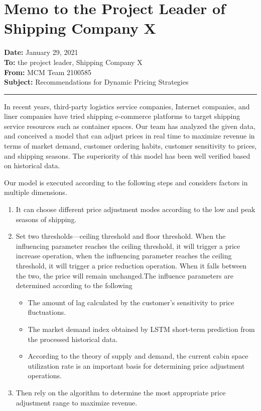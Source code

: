 \section{Memo to the Project Leader of Shipping Company X}
\noindent\textbf{Date:} January 29, 2021\\
\textbf{To:} the project leader, Shipping Company X\\
\textbf{From:} MCM Team 2100585\\
\textbf{Subject:} Recommendations for Dynamic Pricing Strategies\\
\rule[-7pt]{14.3cm}{0.1em}

In recent years, third-party logistics service companies, Internet companies, and liner companies have tried shipping e-commerce platforms to target shipping service resources such as container spaces\parencite{Data}. Our team has analyzed the given data, and conceived a model that can adjust prices in real time to maximize revenue in terms of market demand, customer ordering habits, customer sensitivity to prices, and shipping seasons. The superiority of this model has been well verified based on historical data.

Our model is executed according to the following steps and considers factors in multiple dimensions.
\begin{enumerate}
    \item It can choose different price adjustment modes according to the low and peak seasons of shipping.
    \item Set two thresholds—ceiling threshold and floor threshold. When the influencing parameter reaches the ceiling threshold, it will trigger a price increase operation, when the influencing parameter reaches the ceiling threshold, it will trigger a price reduction operation. When it falls between the two, the price will remain unchanged.The influence parameters are determined according to the following
    \begin{itemize}
        \item[-] The amount of lag calculated by the customer’s sensitivity to price fluctuations.
        \item[-] The market demand index obtained by LSTM short-term prediction from the processed historical data.
        \item[-] According to the theory of supply and demand, the current cabin space utilization rate is an important basis for determining price adjustment operations.
    \end{itemize}
    \item Then rely on the algorithm to determine the most appropriate price adjustment range to maximize revenue.
\end{enumerate}

